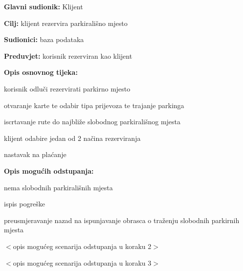     				\begin{packed_item}
    					
    					\item \textbf{Glavni sudionik: } Klijent
    					\item  \textbf{Cilj:} klijent rezervira parkirališno mjesto
    					\item  \textbf{Sudionici:} baza podataka
    					\item  \textbf{Preduvjet:} korisnik rezerviran kao klijent
    					\item  \textbf{Opis osnovnog tijeka:}
    					
    					\item[] \begin{packed_enum}
    						
    						\item korisnik odluči rezervirati parkirno mjesto
    						\item otvaranje karte te odabir tipa prijevoza te trajanje parkinga	
    						\item iscrtavanje rute do najbliže slobodnog parkirališnog mjesta
    						\item klijent odabire jedan od 2 načina rezerviranja
    						\item nastavak na plaćanje
    					\end{packed_enum}
    					
    					\item  \textbf{Opis mogućih odstupanja:}
    					
    					\item[] \begin{packed_item}
    						
    						\item[3.a] nema slobodnih parkirališnih mjesta
    						\item[] \begin{packed_enum}
    							
    							\item ispis pogreške
    							\item preusmjeravanje nazad na ispunjavanje obrasca o traženju slobodnih parkirnih mjesta
    							
    						\end{packed_enum}
    						\item[2.b] $<$opis mogućeg scenarija odstupanja u koraku 2$>$
    						\item[3.a] $<$opis mogućeg scenarija odstupanja  u koraku 3$>$
    						
    					\end{packed_item}
    				\end{packed_item}
